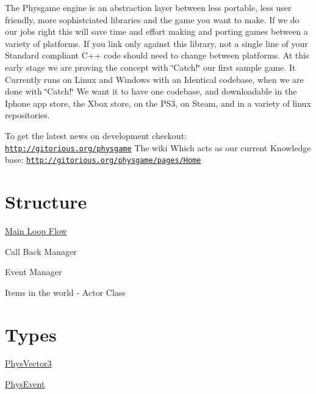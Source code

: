 The Physgame engine is an abstraction layer between less portable, less user friendly, more sophistciated libraries and the game you want to make. If we do our jobs right this will save time and effort making and porting games between a variety of platforms. If you link only against this library, not a single line of your Standard compliant C++ code should need to change between platforms. At this early stage we are proving the concept with \char`\"{}Catch!\char`\"{} our first sample game. It Currently runs on Linux and Windows with an Identical codebase, when we are done with \char`\"{}Catch!\char`\"{} We want it to have one codebase, and downloadable in the Iphone app store, the Xbox store, on the PS3, on Steam, and in a variety of linux repositories.

To get the latest news on development checkout: \href{http://gitorious.org/physgame}{\tt http://gitorious.org/physgame} The wiki Which acts as our current Knowledge base: \href{http://gitorious.org/physgame/pages/Home}{\tt http://gitorious.org/physgame/pages/Home}\hypertarget{index_Engine}{}\section{Structure}\label{index_Engine}
\hyperlink{mainloop1}{Main Loop Flow}

Call Back Manager

Event Manager

Items in the world -\/ Actor Class \hypertarget{index_Data}{}\section{Types}\label{index_Data}
\hyperlink{classPhysVector3}{PhysVector3}

\hyperlink{classPhysEvent}{PhysEvent} 